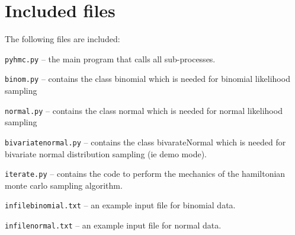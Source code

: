 \documentclass[10pt,letterpaper]{article}
\begin{document}

\section{Included files}
\label{sec:included_files}

The following files are included:

\texttt{pyhmc.py} -- the main program that calls all sub-processes.

\texttt{binom.py} -- contains the class binomial which is needed for binomial
likelihood sampling

\texttt{normal.py} -- contains the class normal which is needed for normal
likelihood sampling

\texttt{bivariatenormal.py} -- contains the class bivarateNormal which is
needed for bivariate normal distribution sampling (ie demo mode).

\texttt{iterate.py}  -- contains the code to perform the mechanics of the
hamiltonian monte carlo sampling algorithm.

\texttt{infilebinomial.txt} -- an example input file for binomial data.

\texttt{infilenormal.txt} -- an example input file for normal data.



\end{document}
